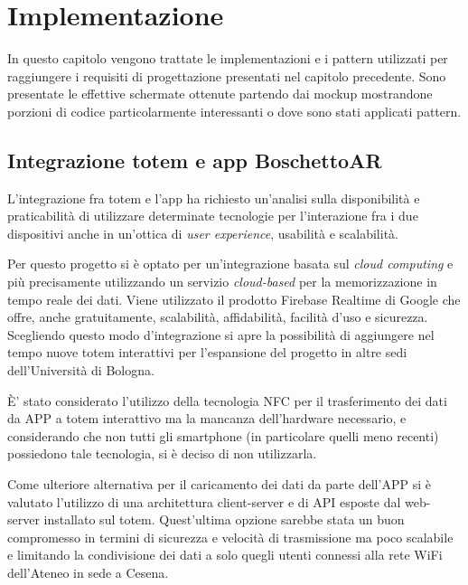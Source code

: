 \chapter{Implementazione}
In questo capitolo vengono trattate le implementazioni e i pattern utilizzati per raggiungere i requisiti di progettazione presentati nel capitolo precedente. Sono presentate le effettive schermate ottenute partendo dai mockup mostrandone porzioni di codice particolarmente interessanti o dove sono stati applicati pattern.

\section{Integrazione totem e app BoschettoAR}
L'integrazione fra totem e l'app ha richiesto un'analisi sulla disponibilità e praticabilità di utilizzare determinate tecnologie per l'interazione fra i due dispositivi anche in un'ottica di \textit{user experience}, usabilità e scalabilità.

Per questo progetto si è optato per un'integrazione basata sul \textit{cloud computing} e più precisamente utilizzando un servizio \textit{cloud-based} per la memorizzazione in tempo reale dei dati. Viene utilizzato il prodotto Firebase Realtime di Google \cite{firebase} che offre, anche gratuitamente, scalabilità, affidabilità, facilità d'uso e sicurezza.
Scegliendo questo modo d'integrazione si apre la possibilità di aggiungere nel tempo nuove totem interattivi per l'espansione del progetto in altre sedi dell'Università di Bologna.

\`E' stato considerato l'utilizzo della tecnologia NFC per il trasferimento dei dati da APP a totem interattivo ma la mancanza dell'hardware necessario, e considerando che non tutti gli smartphone (in particolare quelli meno recenti) possiedono tale tecnologia, si è deciso di non utilizzarla.

Come ulteriore alternativa  per il caricamento dei dati da parte dell'APP si è valutato l'utilizzo di una architettura client-server e di API esposte dal web-server installato sul totem. Quest'ultima opzione sarebbe stata un buon compromesso in termini di sicurezza e velocità di trasmissione ma poco scalabile e limitando la condivisione dei dati a solo quegli utenti connessi alla rete WiFi dell'Ateneo in sede a Cesena.


